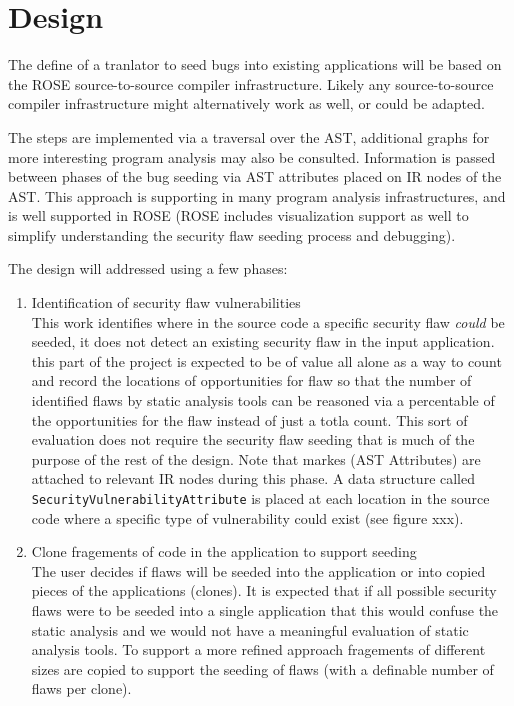 \section{Design}

The define of a tranlator to seed bugs into existing applications will be based on 
the ROSE source-to-source compiler infrastructure.  Likely any source-to-source
compiler infrastructure might alternatively work as well, or could be adapted.

   The steps are implemented via a traversal over the AST, additional graphs
for more interesting program analysis may also be consulted.  Information is passed 
between phases of the bug seeding via AST attributes placed on IR nodes of the 
AST.  This approach is supporting in many program analysis infrastructures, and is
well supported in ROSE (ROSE includes visualization support as well to simplify
understanding the security flaw seeding process and debugging).

The design will addressed using a few phases:
\begin{enumerate}
   \item Identification of security flaw vulnerabilities \\
   This work identifies where in the source code a specific security flaw {\em could}
be seeded, it does not detect an existing security flaw in the input application.
this part of the project is expected to be of value all alone as a way to count
and record the locations of opportunities for flaw so that the number of identified
flaws by static analysis tools can be reasoned via a percentable of the opportunities
for the flaw instead of just a totla count.  This sort of evaluation does not
require the security flaw seeding that is much of the purpose of the rest of the
design.  Note that markes (AST Attributes) are attached to relevant IR nodes during this
phase.  A data structure called {\tt SecurityVulnerabilityAttribute} is placed at
each location in the source code where a specific type of vulnerability could exist
(see figure xxx).

   \item Clone fragements of code in the application to support seeding \\
   The user decides if flaws will be seeded into the application or into copied pieces 
of the applications (clones). It is expected that if all possible security flaws were to
be seeded into a single application that this would confuse the static analysis and 
we would not have a meaningful evaluation of static analysis tools.  To support 
a more refined approach fragements of different sizes are copied to support the 
seeding of flaws (with a definable number of flaws per clone).


\end{enumerate}
